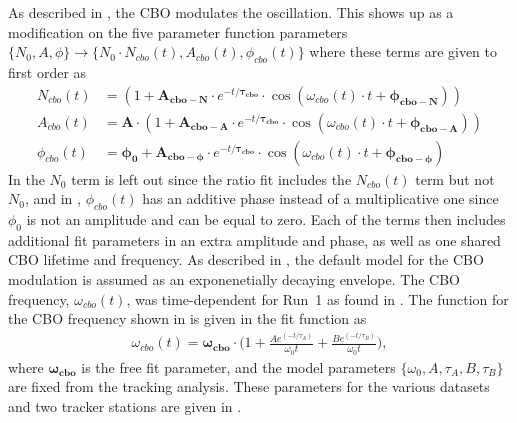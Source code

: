 As described in , the CBO modulates the \wa oscillation. This shows up as a modification on the five parameter function parameters $\{N_{0}, A, \phi\} \rightarrow \{N_{0} \cdot N_{cbo}(t), A_{cbo}(t), \phi_{cbo}(t)\}$ where these terms are given to first order as
    \begin{align}
        N_{cbo}(t) &= (1 + \boldsymbol{A_{cbo-N}} \cdot e^{-t/\boldsymbol{\tau_{cbo}}} \cdot \cos(\omega_{cbo}(t) \cdot t + \boldsymbol{\phi_{cbo-N}})) \label{eq:Ncbo} \\ 
        A_{cbo}(t) &= \boldsymbol{A} \cdot (1 + \boldsymbol{A_{cbo-A}} \cdot e^{-t/\boldsymbol{\tau_{cbo}}} \cdot \cos(\omega_{cbo}(t) \cdot t + \boldsymbol{\phi_{cbo-A}})) \label{eq:Acbo} \\ 
        \phi_{cbo}(t) &= \boldsymbol{\phi_{0}} + \boldsymbol{A_{cbo-\phi}} \cdot e^{-t/\boldsymbol{\tau_{cbo}}} \cdot \cos(\omega_{cbo}(t) \cdot t + \boldsymbol{\phi_{cbo-\phi}}) \label{eq:Phicbo}
    \end{align}
In  the $N_{0}$ term is left out since the ratio fit includes the $N_{cbo}(t)$ term but not $N_{0}$, and in , $\phi_{cbo}(t)$ has an additive phase instead of a multiplicative one since $\phi_{0}$ is not an amplitude and can be equal to zero. Each of the terms then includes additional fit parameters in an extra amplitude and phase, as well as one shared CBO lifetime and frequency. As described in , the default model for the CBO modulation is assumed as an exponenetially decaying envelope. The CBO frequency, $\omega_{cbo}(t)$, was time-dependent for Run~1 as found in . The function for the CBO frequency shown in  is given in the fit function as
    \begin{align} \label{eq:CBOfreqForm}
        \omega_{cbo}(t) = \boldsymbol{\omega_{cbo}} \cdot \Big(1 + \frac{Ae^{(-t/\tau_{A})}}{\omega_{0}t} + \frac{Be^{(-t/\tau_{B})}}{\omega_{0}t}\Big),
    \end{align}
where $\boldsymbol{\omega_{cbo}}$ is the free fit parameter, and the model parameters $\{\omega_{0}, A, \tau_{A}, B, \tau_{B}\}$ are fixed from the tracking analysis. These parameters for the various datasets and two tracker stations are given in . 



